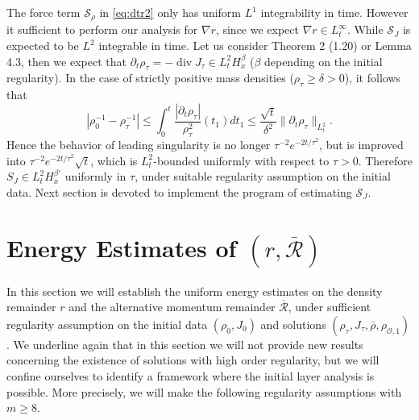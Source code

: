\documentclass[english]{amsart}
\theoremstyle{plain}
\theoremstyle{definition}
\theoremstyle{remark}
\theoremstyle{plain}
\theoremstyle{plain}
\theoremstyle{plain}
\def\d{{\partial}}
\DeclareMathOperator{\diver}{div}
\numberwithin{equation}{section}
\begin{document}
The force term $\mathcal{S}_\rho$ in \eqref{eq:dtr2} only has uniform $L^1$ integrability in time. However it sufficient to perform our analysis for $\nabla r$, since we expect $\nabla r\in L^\infty_t$. While $\mathcal{S}_J$ is expected to be $L^2$ integrable in time. Let us consider \cite{AMZ3} Theorem 2 (1.20) or \cite{JLM} Lemma 4.3, then we expect that $\d_t\rho_\tau=-\diver J_\tau\in L^2_tH^\beta_x$ ($\beta$ depending on the initial regularity). In the case of strictly positive mass densities  ($\rho_\tau\geq\delta>0$), it follows that
\[
|\rho_0^{-1}-\rho_\tau^{-1}|\leq\int_0^t \frac{|\d_t \rho_\tau|}{\rho_\tau^2}(t_1)dt_1\leq \frac{\sqrt{t}}{\delta^2}\|\d_t\rho_\tau\|_{L^2_t}.
\]
Hence the behavior of leading singularity is no longer $\tau^{-2}e^{-2t/\tau^2}$, but is improved into $\tau^{-2}e^{-2t/\tau^2}\sqrt{t}$, which is $L^2_t$-bounded uniformly with respect to $\tau>0$. Therefore $S_J\in L^2_tH^{\beta'}_x$ uniformly in $\tau$, under suitable regularity assumption on the initial data. Next section is devoted to implement the program of estimating $\mathcal{S}_J$.


\section{Energy Estimates of $(r,\overline{\mathcal{R}})$}\label{sect:en_remainder}


In this section we will establish the uniform energy estimates on  the density remainder $r$ and the alternative momentum remainder $\overline{\mathcal{R}}$, under sufficient regularity assumption on the initial data $(\rho_0,J_0)$ and solutions $(\rho_\tau,J_\tau,\bar\rho,\rho_{\mathcal{O},1})$. We underline again that in this section we will not provide new results concerning the existence of solutions with high order regularity, but we will confine ourselves to identify a framework where the initial layer analysis is possible. More precisely, we will make the following regularity assumptions with $m\geq 8$.
\end{document}
